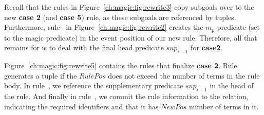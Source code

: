 Recall that the rules in Figure~\ref{ch:magic:fig:rewrite3} copy subgoals over
to the new {\bf case 2} (and {\bf case 5}) rule, as these subgoals are
referenced by  tuples.  Furthermore, rule~ in
Figure~\ref{ch:magic:fig:rewrite2} creates the $m_p$ predicate (set to the
magic predicate) in the event position of our new rule.  Therefore, all that
remains for is to deal with the final head predicate $sup_{i-1}$ for
{\bf case2}. 

Figure~\ref{ch:magic:fig:rewrite5} contains the rules that finalize {\bf case
2}.  Rule~ generates a  tuple if the $RulePos$ does not
exceed the number of terms in the rule body.  In rule~, we reference
the supplementary predicate $sup_{i-1}$ in the head of the rule.  And finally
in rule~, we commit the rule information to the  relation,
indicating the required identifiers and that it has $NewPos$ number of terms in
it.

